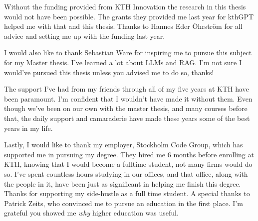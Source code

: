 Without the funding provided from KTH Innovation the research in this thesis would not have been possible. The grants they provided me last year for kthGPT helped me with that and this thesis. Thanks to Hannes Eder Öhrström for all advice and setting me up with the funding last year.


I would also like to thank Sebastian Ware for inspiring me to pursue this subject for my Master thesis. I’ve learned a lot about LLMs and RAG. I’m not sure I would’ve pursued this thesis unless you advised me to do so, thanks!


The support I’ve had from my friends through all of my five years at KTH have been paramount. I’m confident that I wouldn't have made it without them. Even though we’ve been on our own with the master thesis, and many courses before that, the daily support and camaraderie have made these years some of the best years in my life.


Lastly, I would like to thank my employer, Stockholm Code Group, which has supported me in pursuing my degree. They hired me 6 months before enrolling at KTH, knowing that I would become a fulltime student, not many firms would do so. I’ve spent countless hours studying in our offices, and that office, along with the people in it, have been just as significant in helping me finish this degree. Thanks for supporting my side-hustle as a full time student. A special thanks to Patrick Zeits, who convinced me to pursue an education in the first place. I’m grateful you showed me \textit{why} higher education was useful.


\acknowlegmentssignature